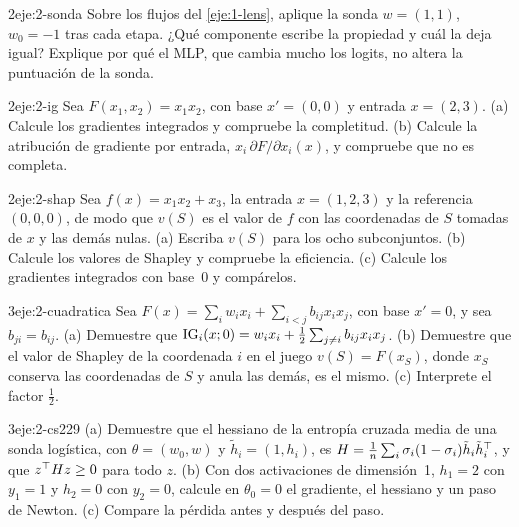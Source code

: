 \begin{ejercicio}{2}{eje:2-sonda}
Sobre los flujos del \cref{eje:1-lens}, aplique la sonda $w=(1,1)$, $w_0=-1$ tras cada etapa. ¿Qué componente escribe la propiedad y cuál la deja igual? Explique por qué el MLP, que cambia mucho los logits, no altera la puntuación de la sonda.
\end{ejercicio}

\begin{ejercicio}{2}{eje:2-ig}
Sea $F(x_1,x_2)=x_1x_2$, con base $x'=(0,0)$ y entrada $x=(2,3)$. (a) Calcule los gradientes integrados y compruebe la completitud. (b) Calcule la atribución de gradiente por entrada, $x_i\,\partial F/\partial x_i(x)$, y compruebe que no es completa.
\end{ejercicio}

\begin{ejercicio}{2}{eje:2-shap}
Sea $f(x)=x_1x_2+x_3$, la entrada $x=(1,2,3)$ y la referencia $(0,0,0)$, de modo que $v(S)$ es el valor de $f$ con las coordenadas de $S$ tomadas de $x$ y las demás nulas. (a) Escriba $v(S)$ para los ocho subconjuntos. (b) Calcule los valores de Shapley y compruebe la eficiencia. (c) Calcule los gradientes integrados con base~0 y compárelos.
\end{ejercicio}

\begin{ejercicio}{3}{eje:2-cuadratica}
Sea $F(x)=\sum_iw_ix_i+\sum_{i<j}b_{ij}x_ix_j$, con base $x'=0$, y sea $b_{ji}=b_{ij}$. (a) Demuestre que $\operatorname{IG}_i(x;0)=w_ix_i+\tfrac12\sum_{j\neq i}b_{ij}x_ix_j$. (b) Demuestre que el valor de Shapley de la coordenada $i$ en el juego $v(S)=F(x_S)$, donde $x_S$ conserva las coordenadas de $S$ y anula las demás, es el mismo. (c) Interprete el factor $\tfrac12$.
\end{ejercicio}

\begin{ejercicio}{3}{eje:2-cs229}
(a) Demuestre que el hessiano de la entropía cruzada media de una sonda logística, con $\theta=(w_0,w)$ y $\tilde h_i=(1,h_i)$, es $H=\frac1n\sum_i\sigma_i(1-\sigma_i)\tilde h_i\tilde h_i^{\top}$, y que $z^{\top} Hz\ge 0$ para todo $z$. (b) Con dos activaciones de dimensión~1, $h_1=2$ con $y_1=1$ y $h_2=0$ con $y_2=0$, calcule en $\theta_0=0$ el gradiente, el hessiano y un paso de Newton. (c) Compare la pérdida antes y después del paso.
\end{ejercicio}
